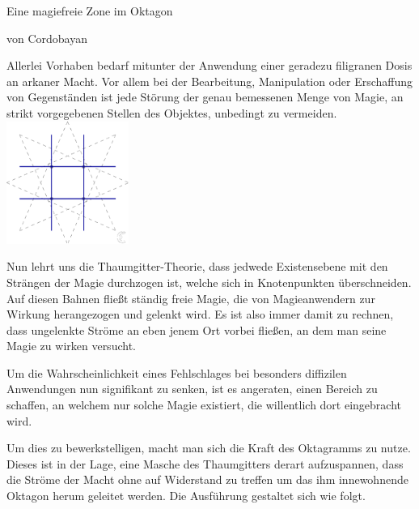 \documentclass[a5paper,8pt]{book}
\begin{document}
\centerline{\huge{Eine magiefreie Zone im Oktagon}}
\begin{flushright}
von Cordobayan
\end{flushright} \setlength{\columnseprule}{0.5pt}
\begin{multicols}{2}
Allerlei Vorhaben bedarf mitunter der Anwendung einer geradezu filigranen Dosis an
arkaner Macht. Vor allem bei der Bearbeitung, Manipulation oder Erschaffung von
Gegenständen ist jede Störung der genau bemessenen Menge von Magie, an strikt
vorgegebenen Stellen des Objektes, unbedingt zu vermeiden.
\includegraphics[height=4cm]{pictures/Gitter_roh.png}

Nun lehrt uns die Thaumgitter-Theorie, dass jedwede Existensebene mit den Strängen der
Magie durchzogen ist, welche sich in Knotenpunkten überschneiden. Auf diesen Bahnen
fließt ständig freie Magie, die von Magieanwendern zur Wirkung herangezogen und gelenkt
wird. Es ist also immer damit zu rechnen, dass ungelenkte Ströme an eben jenem Ort vorbei
fließen, an dem man seine Magie zu wirken versucht.

Um die Wahrscheinlichkeit eines Fehlschlages bei besonders diffizilen Anwendungen nun
signifikant zu senken, ist es angeraten, einen Bereich zu schaffen, an welchem nur solche
Magie existiert, die willentlich dort eingebracht wird.

Um dies zu bewerkstelligen, macht man sich die Kraft des Oktagramms zu nutze. Dieses ist
in der Lage, eine Masche des Thaumgitters derart aufzuspannen, dass die Ströme der Macht
ohne auf Widerstand zu treffen um das ihm innewohnende Oktagon herum geleitet werden. Die
Ausführung gestaltet sich wie folgt.


\end{multicols}
\end{document}
